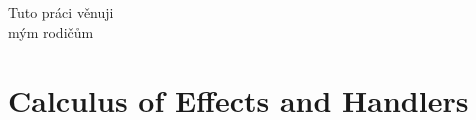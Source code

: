 \documentclass[nofrench]{thesul}
\begin{document}

\dominitoc


\ThesisUL


\nthks

\MakeThesisTitlePage



\begin{ThesisDedication}
  \begin{czech}
    Tuto práci věnuji \\ mým rodičům
  \end{czech}
\end{ThesisDedication}


\tableofcontents

\NoChapterHead

\NoNewPageAfterParts

\mainmatter





\part{Calculus of Effects and Handlers}
\label{part:calculus}
\end{document}
